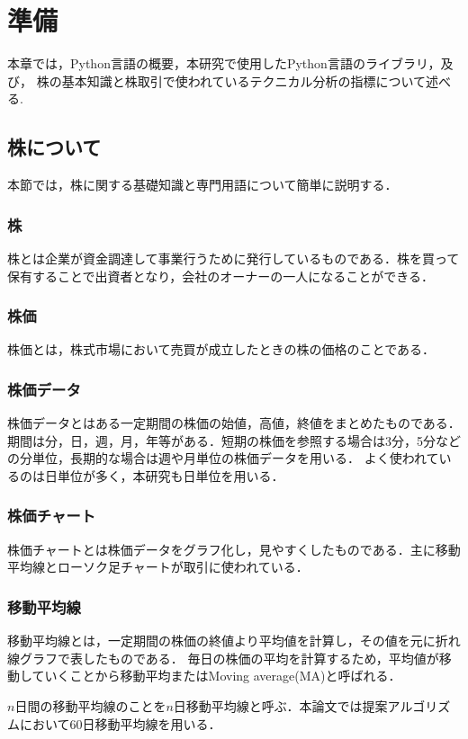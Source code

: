 \chapter{準備}
本章では，Python言語の概要，本研究で使用したPython言語のライブラリ，及び， 株の基本知識と株取引で使われているテクニカル分析の指標について述べる.
\section{株について}
本節では，株に関する基礎知識と専門用語について簡単に説明する．
\subsection{株}
株とは企業が資金調達して事業行うために発行しているものである．株を買って保有することで出資者となり，会社のオーナーの一人になることができる\cite{stock}．

\subsection{株価}
株価とは，株式市場において売買が成立したときの株の価格のことである\cite{pythontrading}．
\subsection{株価データ}
株価データとはある一定期間の株価の始値，高値，終値をまとめたものである．期間は分，日，週，月，年等がある．短期の株価を参照する場合は3分，5分などの分単位，長期的な場合は週や月単位の株価データを用いる．
よく使われているのは日単位が多く，本研究も日単位を用いる\cite{pythontrading}．
\subsection{株価チャート}
株価チャートとは株価データをグラフ化し，見やすくしたものである．主に移動平均線とローソク足チャートが取引に使われている\cite{pythontrading}．

\subsection{移動平均線}
移動平均線とは，一定期間の株価の終値より平均値を計算し，その値を元に折れ線グラフで表したものである．
毎日の株価の平均を計算するため，平均値が移動していくことから移動平均またはMoving average(MA)と呼ばれる．

$n$日間の移動平均線のことを$n$日移動平均線と呼ぶ\cite{pythontrading}．本論文では提案アルゴリズムにおいて60日移動平均線を用いる．

